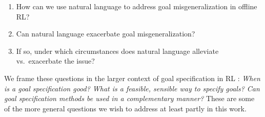 \documentclass[../thesis-proposal/main.tex]{subfiles}
\begin{document}
\begin{enumerate}
  \item How can we use natural language to address goal misgeneralization in offline RL?
  \item Can natural language exacerbate goal misgeneralization?
  \item If so, under which circumstances does natural language alleviate vs.~exacerbate the issue?
\end{enumerate}

We frame these questions in the larger context of goal specification in RL
\citep{white_unifying_2017, liu_goal-conditioned_2022, bansal_specification-guided_2022}:
\textit{When is a goal specification good? What is a feasible, sensible way to specify goals? Can
goal specification methods be used in a complementary manner?} These are some of the more general
questions we wish to address at least partly in this work.

\ifSubfilesClassLoaded{%
  
}{}
\end{document}
